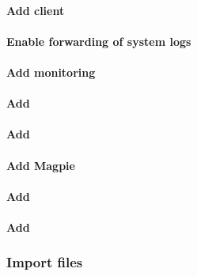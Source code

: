 \documentclass[letterpaper]{article}
\begin{document}
\paragraph{Add \Lustre{} client} \label{sec:lustre_client}




\paragraph{Enable forwarding of system logs} \label{sec:add_syslog}


\clearpage
\paragraph{Add \Nagios{} monitoring} \label{sec:add_nagios}


\clearpage
\paragraph{Add \clustershell{}}


\paragraph{Add \genders{}}


\paragraph{Add Magpie}


\paragraph{Add \conman{}} \label{sec:add_conman}


\paragraph{Add \nhc{}} \label{sec:add_nhc}



\subsubsection{Import files} \label{sec:file_import}



\vspace*{-.1cm}




\end{document}
